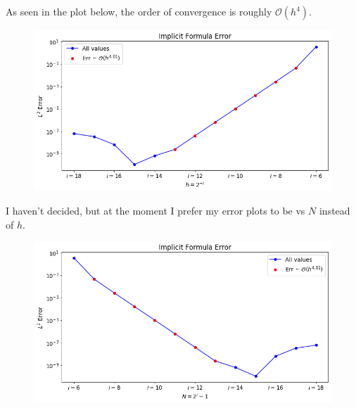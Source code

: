 \documentclass[12pt]{article}
\newcommand{\bigO}{\mathcal{O}}
\begin{document}
As seen in the plot below, the order of convergence is roughly $\bigO(h^4)$. 
\begin{figure}[H]
	\includegraphics[width=1\textwidth]{hw02_p4a_convergence_2}
	\centering
\end{figure}

I haven't decided, but at the moment I prefer my error plots to be vs $N$ instead of $h$.

\begin{figure}[H]
	\includegraphics[width=1\textwidth]{hw02_p4a_convergence}
	\centering
\end{figure}


\bigbreak
\end{document}
